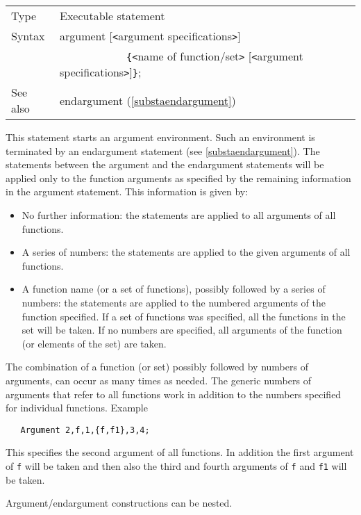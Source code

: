 \noindent \begin{tabular}{ll}
Type & Executable statement\\
Syntax & argument [{\tt<}argument specifications{\tt>}] \\ &
    \ \ \ \ \ \ \ \ \ \ \ \
 \verb:{:{\tt<}name of function/set{\tt>}
[{\tt<}argument specifications{\tt>}]\verb:}:; \\
See also & endargument (\ref{substaendargument})
\end{tabular} \vspace{4mm}

\noindent This statement starts an argument 
environment. Such an environment is terminated 
by an endargument statement (see \ref{substaendargument}). The statements 
between the argument and the endargument\index{endargument} statements will 
be applied only to the function arguments as specified by the remaining 
information in the argument statement. This information is given by:
\begin{itemize}
\item   No further information: the statements are applied to all arguments 
of all functions.
\item   A series of numbers: the statements are applied to the given 
arguments of all functions.
\item   A function name (or a set of functions), possibly followed by a 
series of numbers: the statements are applied to the numbered arguments of 
the function specified. If a set of functions was specified, all the 
functions in the set will be taken. If no numbers are specified, all 
arguments of the function (or elements of the set) are taken.
\end{itemize}
The combination of a function (or set) possibly followed by numbers of 
arguments, can occur as many times as needed. The generic numbers of 
arguments that refer to all functions work in addition to the numbers 
specified for individual functions. Example\vspace{1mm}
\begin{verbatim}
   Argument 2,f,1,{f,f1},3,4;
\end{verbatim}
This specifies the second argument of all functions. In addition the first 
argument of \verb:f: will be taken and then also the third and fourth 
arguments of \verb:f: and \verb:f1: will be taken. \vspace{4mm}

\noindent Argument/endargument constructions can be nested. \vspace{10mm}

